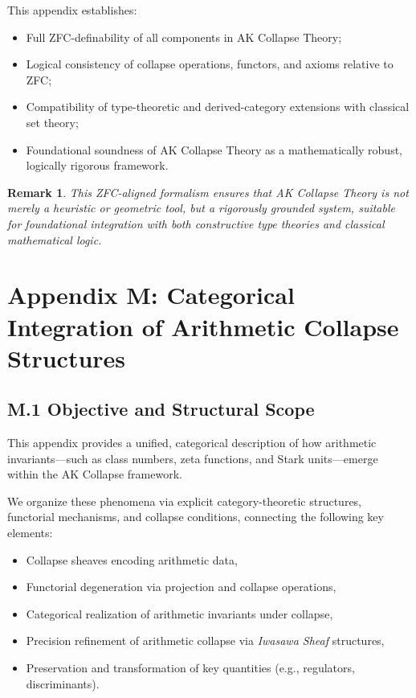 \documentclass[11pt]{article}
\newtheorem{remark}[theorem]{Remark}
\begin{document}
This appendix establishes:

\begin{itemize}
    \item Full ZFC-definability of all components in AK Collapse Theory;
    \item Logical consistency of collapse operations, functors, and axioms relative to ZFC;
    \item Compatibility of type-theoretic and derived-category extensions with classical set theory;
    \item Foundational soundness of AK Collapse Theory as a mathematically robust, logically rigorous framework.
\end{itemize}

\begin{remark}
This ZFC-aligned formalism ensures that AK Collapse Theory is not merely a heuristic or geometric tool, but a rigorously grounded system, suitable for foundational integration with both constructive type theories and classical mathematical logic.
\end{remark}




\section*{Appendix M: Categorical Integration of Arithmetic Collapse Structures}

\subsection*{M.1 Objective and Structural Scope}

This appendix provides a unified, categorical description of how arithmetic invariants—such as class numbers, zeta functions, and Stark units—emerge within the AK Collapse framework.  

We organize these phenomena via explicit category-theoretic structures, functorial mechanisms, and collapse conditions, connecting the following key elements:
\begin{itemize}
  \item Collapse sheaves encoding arithmetic data,
  \item Functorial degeneration via projection and collapse operations,
  \item Categorical realization of arithmetic invariants under collapse,
  \item Precision refinement of arithmetic collapse via \emph{Iwasawa Sheaf} structures,
  \item Preservation and transformation of key quantities (e.g., regulators, discriminants).
\end{itemize}
\end{document}
